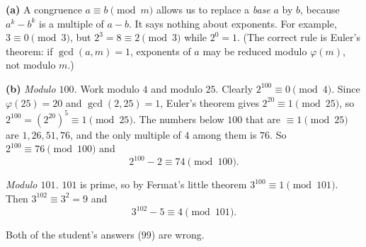 \textbf{(a)} A congruence $a\equiv b\pmod m$ allows us to replace a \emph{base} $a$ by $b$, because $a^k-b^k$ is a multiple of $a-b$. It says nothing about exponents. For example, $3\equiv0\pmod3$, but $2^3=8\equiv2\pmod3$ while $2^0=1$. (The correct rule is Euler's theorem: if $\gcd(a,m)=1$, exponents of $a$ may be reduced modulo $\varphi(m)$, not modulo $m$.)

\textbf{(b)} \emph{Modulo $100$.} Work modulo $4$ and modulo $25$. Clearly $2^{100}\equiv0\pmod4$. Since $\varphi(25)=20$ and $\gcd(2,25)=1$, Euler's theorem gives $2^{20}\equiv1\pmod{25}$, so $2^{100}=\left(2^{20}\right)^5\equiv1\pmod{25}$. The numbers below $100$ that are $\equiv1\pmod{25}$ are $1,26,51,76$, and the only multiple of $4$ among them is $76$. So $2^{100}\equiv76\pmod{100}$ and
\[2^{100}-2\equiv\boxed{74}\pmod{100}.\]

\emph{Modulo $101$.} $101$ is prime, so by Fermat's little theorem $3^{100}\equiv1\pmod{101}$. Then $3^{102}\equiv3^2=9$ and
\[3^{102}-5\equiv\boxed{4}\pmod{101}.\]

Both of the student's answers ($99$) are wrong.
